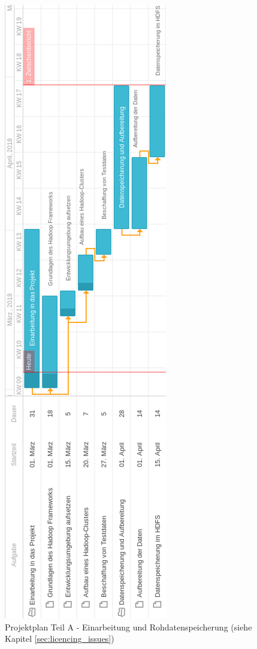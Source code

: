 \begin{figure}[p]
  \centering
  \includegraphics[width=\textwidth,height=\textheight,keepaspectratio]{./resource/ganttA.png}
  \caption{Projektplan Teil A - Einarbeitung und Rohdatenspeicherung (siehe Kapitel \ref{sec:licencing_issues})}
  \label{fig:ganttA}
\end{figure}

